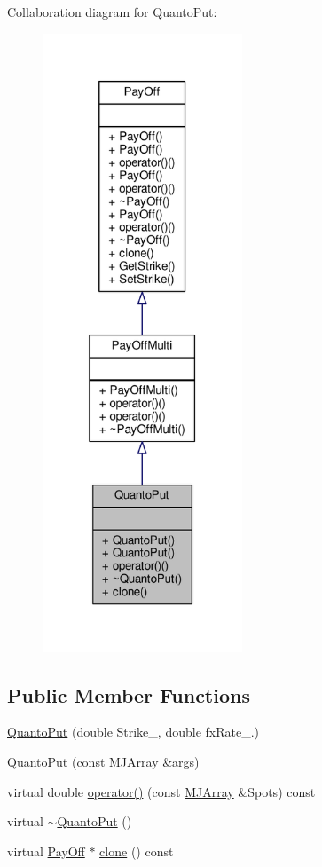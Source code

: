 Collaboration diagram for Quanto\+Put\+:
\nopagebreak
\begin{figure}[H]
\begin{center}
\leavevmode
\includegraphics[width=169pt]{classQuantoPut__coll__graph}
\end{center}
\end{figure}
\subsection*{Public Member Functions}
\begin{DoxyCompactItemize}
\item 
\hyperlink{classQuantoPut_ad3f3ade278eb64e7327523f4c8454ceb}{Quanto\+Put} (double Strike\+\_\+, double fx\+Rate\+\_.)
\item 
\hyperlink{classQuantoPut_ad153cb9f172e6afa3fd6a7e6d9eb087a}{Quanto\+Put} (const \hyperlink{classMJArray}{M\+J\+Array} \&\hyperlink{path__generation_8h_a75c13cde2074f502cc4348c70528572d}{args})
\item 
virtual double \hyperlink{classQuantoPut_a76cf359e7b7c31dc39b8f2c20d145b92}{operator()} (const \hyperlink{classMJArray}{M\+J\+Array} \&Spots) const
\item 
virtual \hyperlink{classQuantoPut_a2c07de96ba733c2963001cd9dc98ac94}{$\sim$\+Quanto\+Put} ()
\item 
virtual \hyperlink{classPayOff}{Pay\+Off} $\ast$ \hyperlink{classQuantoPut_af6ffdcc7c2ebb6f38f306192aa471960}{clone} () const
\end{DoxyCompactItemize}
